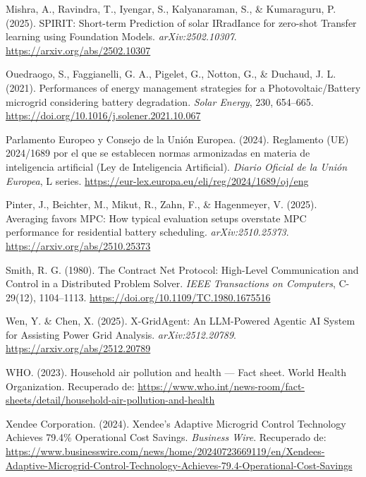 \documentclass[12pt,letterpaper]{article}
\begin{document}
\begin{description}[style=nextline, leftmargin=0pt, labelindent=0pt, itemsep=6pt]
\item[Mishra et al. (2025)]
Mishra, A., Ravindra, T., Iyengar, S., Kalyanaraman, S., \& Kumaraguru, P. (2025). SPIRIT: Short-term Prediction of solar IRradIance for zero-shot Transfer learning using Foundation Models. \textit{arXiv:2502.10307}. \url{https://arxiv.org/abs/2502.10307}

\item[Ouedraogo et al. (2021)]
Ouedraogo, S., Faggianelli, G. A., Pigelet, G., Notton, G., \& Duchaud, J. L. (2021). Performances of energy management strategies for a Photovoltaic/Battery microgrid considering battery degradation. \textit{Solar Energy}, 230, 654--665. \url{https://doi.org/10.1016/j.solener.2021.10.067}

\item[Parlamento Europeo (2024)]
Parlamento Europeo y Consejo de la Uni\'on Europea. (2024). Reglamento (UE) 2024/1689 por el que se establecen normas armonizadas en materia de inteligencia artificial (Ley de Inteligencia Artificial). \textit{Diario Oficial de la Uni\'on Europea}, L series. \url{https://eur-lex.europa.eu/eli/reg/2024/1689/oj/eng}

\item[Pinter et al. (2025)]
Pinter, J., Beichter, M., Mikut, R., Zahn, F., \& Hagenmeyer, V. (2025). Averaging favors MPC: How typical evaluation setups overstate MPC performance for residential battery scheduling. \textit{arXiv:2510.25373}. \url{https://arxiv.org/abs/2510.25373}

\item[Smith (1980)]
Smith, R. G. (1980). The Contract Net Protocol: High-Level Communication and Control in a Distributed Problem Solver. \textit{IEEE Transactions on Computers}, C-29(12), 1104--1113. \url{https://doi.org/10.1109/TC.1980.1675516}

\item[Wen \& Chen (2025)]
Wen, Y. \& Chen, X. (2025). X-GridAgent: An LLM-Powered Agentic AI System for Assisting Power Grid Analysis. \textit{arXiv:2512.20789}. \url{https://arxiv.org/abs/2512.20789}

\item[WHO (2023)]
WHO. (2023). Household air pollution and health --- Fact sheet. World Health Organization. Recuperado de: \url{https://www.who.int/news-room/fact-sheets/detail/household-air-pollution-and-health}

\item[Xendee (2024)]
Xendee Corporation. (2024). Xendee's Adaptive Microgrid Control Technology Achieves 79.4\% Operational Cost Savings. \textit{Business Wire}. Recuperado de: \url{https://www.businesswire.com/news/home/20240723669119/en/Xendees-Adaptive-Microgrid-Control-Technology-Achieves-79.4-Operational-Cost-Savings}

\end{description}
\end{document}
